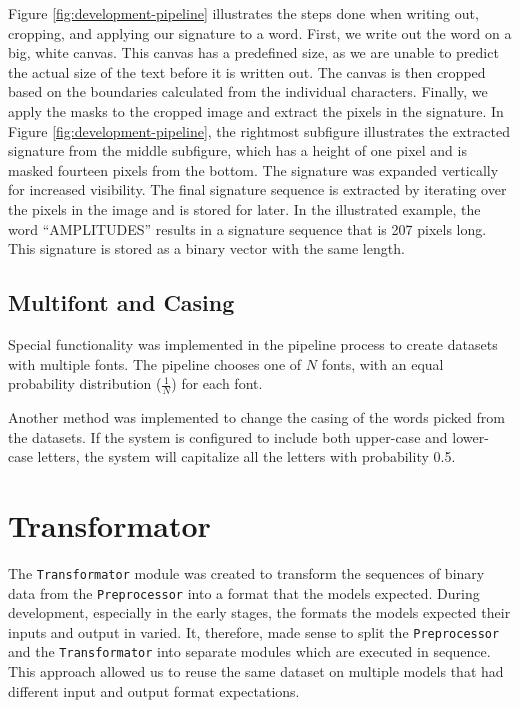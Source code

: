 Figure \ref{fig:development-pipeline} illustrates the steps done when writing out, cropping, and applying our signature to a word. First, we write out the word on a big, white canvas. This canvas has a predefined size, as we are unable to predict the actual size of the text before it is written out. The canvas is then cropped based on the boundaries calculated from the individual characters. Finally, we apply the masks to the cropped image and extract the pixels in the signature. In Figure \ref{fig:development-pipeline}, the rightmost subfigure illustrates the extracted signature from the middle subfigure, which has a height of one pixel and is masked fourteen pixels from the bottom. The signature was expanded vertically for increased visibility. The final signature sequence is extracted by iterating over the pixels in the image and is stored for later. In the illustrated example, the word ``AMPLITUDES'' results in a signature sequence that is 207 pixels long. This signature is stored as a binary vector with the same length.

\subsection{Multifont and Casing}
Special functionality was implemented in the pipeline process to create datasets with multiple fonts. The pipeline chooses one of \(N\) fonts, with an equal probability distribution (\(\frac{1}{N}\)) for each font.

Another method was implemented to change the casing of the words picked from the datasets. If the system is configured to include both upper-case and lower-case letters, the system will capitalize all the letters with probability 0.5.


\section{Transformator}
\label{sec:transformator}
The {\tt Transformator} module was created to transform the sequences of binary data from the {\tt Preprocessor} into a format that the models expected. During development, especially in the early stages, the formats the models expected their inputs and output in varied. It, therefore, made sense to split the {\tt Preprocessor} and the {\tt Transformator} into separate modules which are executed in sequence. This approach allowed us to reuse the same dataset on multiple models that had different input and output format expectations.

